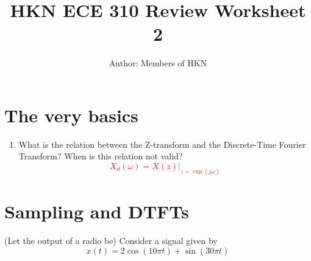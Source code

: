 \documentclass{article}
\title{HKN ECE 310 Review Worksheet 2}
\author{Author: Members of HKN }
\date{}
\begin{document}
\maketitle

\section{The very basics}
\begin{enumerate}
    \item What is the relation between the Z-transform and the Discrete-Time Fourier Transform? When is this relation not valid?
    \textcolor{red}{$$ X_{d}(\omega) = X(z)\vert_{z=\exp(j\omega)} $$}

\end{enumerate}

\section{Sampling and DTFTs}
(Let the output of a radio be) Consider a signal given by
$$
x(t) = 2\cos(10\pi t) + \sin(30\pi t)
$$
\end{document}
